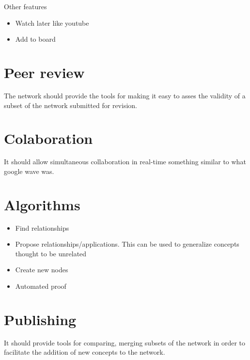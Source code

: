 Other features
\begin{itemize}
 \item Watch later like youtube
 \item Add to board
\end{itemize}



\section{Peer review}

The network should provide the tools for making it easy
to asses the validity of a subset of the network submitted
for revision.

\section{Colaboration}
It should allow simultaneous collaboration in real-time something
similar to what google wave was.



\section{Algorithms}
\begin{itemize}
 \item Find relationships
 \item Propose relationships/applications. This can be used
 to generalize concepts thought to be unrelated
 \item Create new nodes
 \item Automated proof
\end{itemize}


\section{Publishing}
It should provide tools for comparing, merging subsets of the
network in order to facilitate the addition of new concepts
to the network.